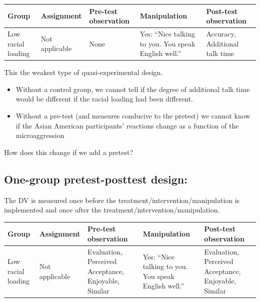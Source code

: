 \documentclass[
  english,
]{book}
\providecommand{\tightlist}{%
  \setlength{\itemsep}{0pt}\setlength{\parskip}{0pt}}
\begin{document}
\begin{longtable}[]{@{}
  >{\raggedright\arraybackslash}p{}
  >{\raggedright\arraybackslash}p{}
  >{\raggedright\arraybackslash}p{}
  >{\raggedright\arraybackslash}p{}
  >{\raggedright\arraybackslash}p{}@{}}
\toprule
Group & Assignment & Pre-test observation & Manipulation & Post-test observation \\
\midrule
\endhead
Low racial loading & Not applicable & None & Yes: ``Nice talking to you. You speak English well.'' & Accuracy, Additional talk time \\
\bottomrule
\end{longtable}

This the weakest type of quasi-experimental design.

\begin{itemize}
\tightlist
\item
  Without a control group, we cannot tell if the degree of additional talk time would be different if the racial loading had been different.
\item
  Without a pre-test (and measures conducive to the pretest) we cannot know if the Asian American participants' reactions change as a function of the microaggression
\end{itemize}

How does this change if we add a pretest?

\hypertarget{one-group-pretest-posttest-design}{%
\subsection{One-group pretest-posttest design:}\label{one-group-pretest-posttest-design}}

The DV is measured once before the treatment/intervention/manipulation is implemented and once after the treatment/intervention/manipulation.

\begin{longtable}[]{@{}
  >{\raggedright\arraybackslash}p{}
  >{\raggedright\arraybackslash}p{}
  >{\raggedright\arraybackslash}p{}
  >{\raggedright\arraybackslash}p{}
  >{\raggedright\arraybackslash}p{}@{}}
\toprule
Group & Assignment & Pre-test observation & Manipulation & Post-test observation \\
\midrule
\endhead
Low racial loading & Not applicable & Evaluation, Perceived Acceptance, Enjoyable, Similar & Yes: ``Nice talking to you. You speak English well.'' & Evaluation, Perceived Acceptance, Enjoyable, Similar \\
\bottomrule
\end{longtable}
\end{document}
